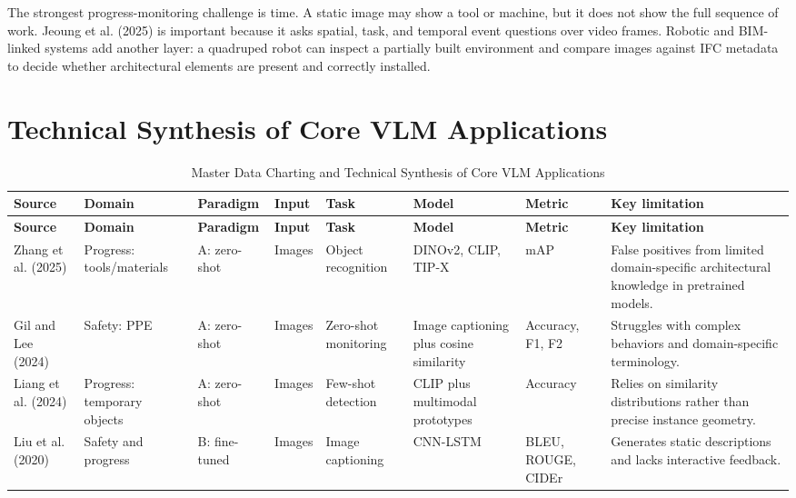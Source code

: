 \documentclass[10pt,letterpaper]{article}
\begin{document}
The strongest progress-monitoring challenge is time. A static image may show a tool or machine, but it does not show the full sequence of work. Jeoung et al. (2025) is important because it asks spatial, task, and temporal event questions over video frames. Robotic and BIM-linked systems add another layer: a quadruped robot can inspect a partially built environment and compare images against IFC metadata to decide whether architectural elements are present and correctly installed.

\section{Technical Synthesis of Core VLM Applications}

\begin{landscape}
\scriptsize
{}
\begin{longtable}{L{2.9cm} L{2.4cm} L{1.6cm} L{1.8cm} L{2.4cm} L{2.7cm} L{2.2cm} L{4.9cm}}
\caption{Master Data Charting and Technical Synthesis of Core VLM Applications}\\
\toprule
{}
\textbf{Source} & \textbf{Domain} & \textbf{Paradigm} & \textbf{Input} & \textbf{Task} & \textbf{Model} & \textbf{Metric} & \textbf{Key limitation}\\
\midrule
\endfirsthead
\toprule
{}
\textbf{Source} & \textbf{Domain} & \textbf{Paradigm} & \textbf{Input} & \textbf{Task} & \textbf{Model} & \textbf{Metric} & \textbf{Key limitation}\\
\midrule
\endhead
\bottomrule
\endfoot
Zhang et al. (2025) & Progress: tools/materials & A: zero-shot & Images & Object recognition & DINOv2, CLIP, TIP-X & mAP & False positives from limited domain-specific architectural knowledge in pretrained models.\\
Gil and Lee (2024) & Safety: PPE & A: zero-shot & Images & Zero-shot monitoring & Image captioning plus cosine similarity & Accuracy, F1, F2 & Struggles with complex behaviors and domain-specific terminology.\\
Liang et al. (2024) & Progress: temporary objects & A: zero-shot & Images & Few-shot detection & CLIP plus multimodal prototypes & Accuracy & Relies on similarity distributions rather than precise instance geometry.\\
Liu et al. (2020) & Safety and progress & B: fine-tuned & Images & Image captioning & CNN-LSTM & BLEU, ROUGE, CIDEr & Generates static descriptions and lacks interactive feedback.\\

\end{longtable}
\end{landscape}
\end{document}
